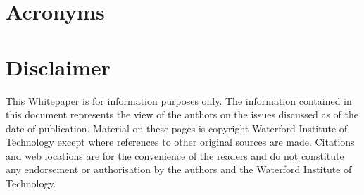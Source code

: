 \documentclass[a4paper]{article}
\begin{document}








\newpage




\appendix
	
\section{Acronyms}


\section{Disclaimer}
This Whitepaper is for information purposes only. The information contained in this document represents the view of the authors on the issues discussed as of the date of publication. Material on these pages is copyright Waterford Institute of Technology except where references to other original sources are made. Citations and web locations are for the convenience of the readers and do not constitute any endorsement or authorisation by the authors and the Waterford Institute of Technology. 
	
\end{document}
